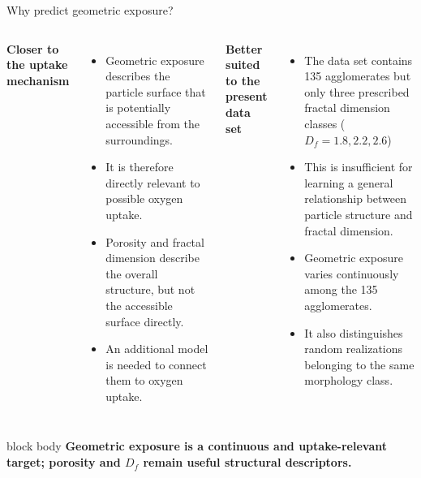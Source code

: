 \documentclass[aspectratio=169,11pt]{beamer}
\newcommand{\hi}[1]{\textcolor{tumblue}{\textbf{#1}}}
\newcommand{\takeaway}[1]{%
	\begin{beamercolorbox}[rounded=true,sep=.55em]{block body}
		\centering\color{tumdark}\textbf{#1}
\end{beamercolorbox}}
\begin{document}
\begin{frame}{Why predict geometric exposure?}
	
	\begin{columns}[T,onlytextwidth]
		\small
		\hi{Closer to the uptake mechanism}
		
		\begin{itemize}
			\item Geometric exposure describes the particle surface that is potentially
			accessible from the surroundings.
			
			\item It is therefore directly relevant to possible oxygen uptake.
			
			\item Porosity and fractal dimension describe the overall structure, but
			not the accessible surface directly.
			
			\item An additional  model is needed to connect them
			to oxygen uptake.
		\end{itemize}
		
		\hi{Better suited to the present data set}
		
		\begin{itemize}\itemsep0.1ex
			\item The data set contains 135 agglomerates but only three prescribed
			fractal dimension classes ($D_f=1.8, 2.2, 2.6$)
			
			\item This is insufficient for learning a general relationship between
			particle structure and fractal dimension.
			
			\item Geometric exposure varies continuously among the 135 agglomerates.
			
			\item It also distinguishes random realizations belonging to the same
			morphology class.
		\end{itemize}
		
	\end{columns}
	
	\vspace{-0.1cm}
	\takeaway{\small Geometric exposure is a continuous and uptake-relevant target;
		porosity and $D_f$ remain useful structural descriptors.}
	
\end{frame}
\end{document}
